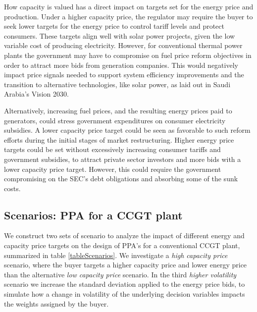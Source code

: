 \documentclass[informs]{informs3}
\begin{document}
How capacity is valued has a direct impact on targets set for the energy price and production. Under a higher capacity price, the regulator may require the buyer to seek lower targets for the energy price to control tariff levels and protect consumers. These targets align well with solar power projects, given the low variable cost of producing electricity. However, for conventional thermal power plants the government may have to compromise on fuel price reform objectives in order to attract more bids from generation companies. This would negatively impact price signals needed to support system efficiency improvements and the transition to alternative technologies, like solar power, as laid out in Saudi Arabia’s Vision 2030. 

Alternatively, increasing fuel prices, and the resulting energy prices paid to generators, could stress government expenditures on consumer electricity subsidies. A lower capacity price target could be seen as favorable to such reform efforts during the initial stages of market restructuring. Higher energy price targets could be set without excessively increasing consumer tariffs and government subsidies, to attract private sector investors and more bids with a lower capacity price target. However, this could require the government compromising on the SEC’s debt obligations and absorbing some of the sunk costs.

\subsection{Scenarios: PPA for a CCGT plant }\label{subsection_ScenarioDesign}

We construct two sets of scenario to analyze the impact of different energy and capacity price targets on the design of PPA's for a conventional CCGT plant,  summarized in table \ref{tableScenarios}. We investigate a \textit{high capacity price} scenario, where the buyer targets a higher capacity price and lower energy price than the alternative \textit{low capacity price} scenario. In the third \textit{higher volatility} scenario we increase the standard deviation applied to the energy price bids, to simulate how a change in volatility of the underlying decision variables impacts the weights assigned by the buyer.
\end{document}
